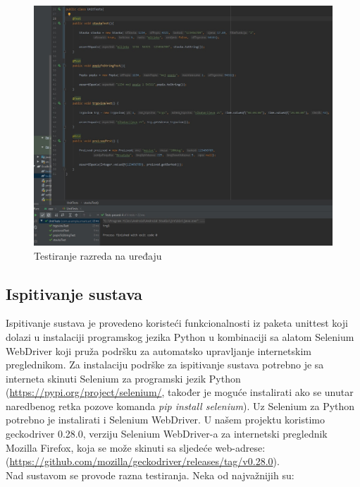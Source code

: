 			\begin{figure}[H]
				\centering
				\includegraphics[scale=0.5]{slike/androidTest2.jpg}
				\caption{Testiranje razreda na uređaju}
				\label{fig:test_uredaj_class}
			\end{figure}
		
		\subsection{Ispitivanje sustava}
			
			Ispitivanje sustava je provedeno koristeći funkcionalnosti iz paketa unittest koji dolazi u instalaciji programskog jezika Python u kombinaciji sa alatom Selenium WebDriver koji pruža podršku za automatsko upravljanje internetskim preglednikom. Za instalaciju podrške za ispitivanje sustava potrebno je sa interneta skinuti Selenium za programski jezik Python (\url{https://pypi.org/project/selenium/}, također je moguće instalirati ako se unutar naredbenog retka pozove komanda \textit{pip install selenium}). Uz Selenium za Python potrebno je instalirati i Selenium WebDriver. U našem projektu koristimo geckodriver 0.28.0, verziju Selenium WebDriver-a za internetski preglednik Mozilla Firefox, koja se može skinuti sa sljedeće web-adrese: (\url{https://github.com/mozilla/geckodriver/releases/tag/v0.28.0}).\\
			Nad sustavom se provode razna testiranja. Neka od najvažnijih su:
			
